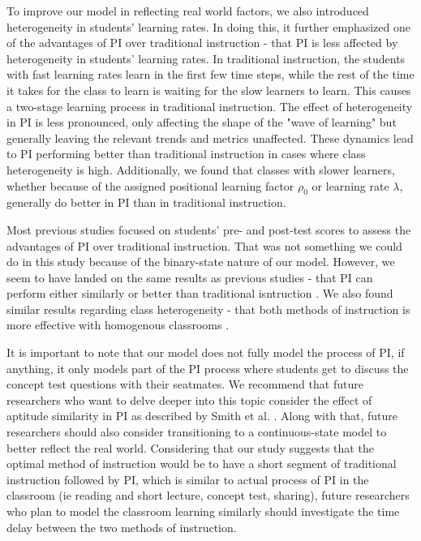 To improve our model in reflecting real world factors, we also introduced heterogeneity in students' learning rates.
In doing this, it further emphasized one of the advantages of PI over traditional instruction - that PI is less affected by heterogeneity in students' learning rates.
In traditional instruction, the students with fast learning rates learn in the first few time steps, while the rest of the time it takes for the class to learn is waiting for the slow learners to learn.
This causes a two-stage learning process in traditional instruction.
The effect of heterogeneity in PI is less pronounced, only affecting the shape of the "wave of learning" but generally leaving the relevant trends and metrics unaffected.
These dynamics lead to PI performing better than traditional instruction in cases where class heterogeneity is high.
Additionally, we found that classes with slower learners, whether because of the assigned positional learning factor $\rho_0$ or learning rate $\lambda$, generally do better in PI than in traditional instruction.

Most previous studies focused on students' pre- and post-test scores to assess the advantages of PI over traditional instruction. 
That was not something we could do in this study because of the binary-state nature of our model.
However, we seem to have landed on the same results as previous studies - that PI can perform either similarly or better than traditional isntruction \cite{crouch2001peer,lasry2008peer,thacker1994comparing,smith2009peer}.
We also found similar results regarding class heterogeneity - that both methods of instruction is more effective with homogenous classrooms \cite{roxas2010seating}.

It is important to note that our model does not fully model the process of PI, if anything, it only models part of the PI process where students get to discuss the concept test questions with their seatmates.
We recommend that future researchers who want to delve deeper into this topic consider the effect of aptitude similarity in PI as described by Smith et al. \cite{smith2009peer}.
Along with that, future researchers should also consider transitioning to a continuous-state model to better reflect the real world.
Considering that our study suggests that the optimal method of instruction would be to have a short segment of traditional instruction followed by PI, which is similar to actual process of PI in the classroom (ie reading and short lecture, concept test, sharing), future researchers who plan to model the classroom learning similarly should investigate the time delay between the two methods of instruction.